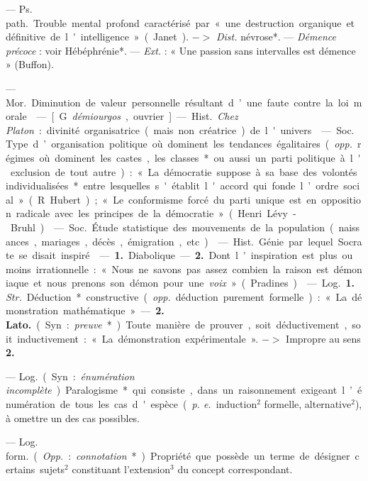 \begin{itemize}[leftmargin=1cm, label=, itemsep=1pt]
 — \si{Ps. path.} Trouble mental
profond caractérisé par « une destruction organique et définitive de
l'intelligence » (Janet). $->$ {\it Dist.}
névrose*. — {\it Démence précoce} : voir
Hébéphrénie*. — {\it Ext.} : « Une passion sans intervalles est démence »
(Buffon).

 — \si{Mor.} Diminution de
valeur personnelle résultant d’une
faute contre la loi morale.

 — [G. {\it démiourgos}, ouvrier]
— \si{Hist.} {\it Chez Platon} : divinité organisatrice
(mais non créatrice) de l'univers.

 — \si{Soc.} Type d’organisation politique où dominent les
tendances égalitaires ({\it opp.} régimes
où dominent les castes, les classes*
ou aussi un parti politique à l'exclusion de tout autre) : « La démocratie suppose à sa base des volontés
individualisées* entre lesquelles
s'établit l'accord qui fonde l’ordre
social » (R. Hubert); « Le conformisme forcé du parti unique est
en opposition radicale avec les principes de la démocratie » (Henri
Lévy-Bruhl).

 — \si{Soc.} Étude statistique des mouvements de la population (naissances, mariages, décès, émigration, etc.).

 — \si{Hist.} Génie par
lequel Socrate se disait inspiré.

 — {\bf 1.} Diabolique. — {\bf 2.}
Dont l'inspiration est plus ou moins
irrationnelle : « Nous ne savons pas
assez combien la raison est démoniaque et nous prenons son démon
pour une {\it voix} » (Pradines).

 — \si{Log.} {\bf 1.} {\it Str.} Déduction* constructive ({\it opp.} déduction
purement formelle) : « La démonstration mathématique ». — {\bf 2. Lato.}
(Syn. : {\it preuve}*). Toute manière de
prouver, soit déductivement, soit
inductivement : « La démonstration
expérimentale ». $->$ Impropre au
sens {\bf 2.}

 — \si{Log.} (Syn. : {\it énumération incomplète}).
Paralogisme* qui consiste, dans un
raisonnement exigeant l’énumération de tous les cas d'espèce ({\it p. e.}
induction$^2$ formelle, alternative$^2$), à omettre un des cas possibles.

 — \si{Log. form.} ({\it Opp.} : {\it connotation}*). 
Propriété que possède un terme de désigner certains sujets$^2$
constituant l'extension$^3$ du concept correspondant.


\end{itemize}
